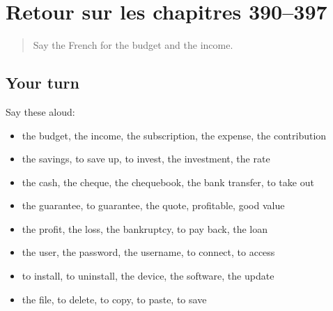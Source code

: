 \section[(dialogue)]{Retour sur les chapitres 390–397}

\label{lesson:FR-R397-revision-390-397}



\begin{quote}
Say the French for the budget and the income.
\end{quote}

\subsection*{Your turn}
Say these aloud:

\begin{itemize}
\raggedright
  \item the budget, the income, the subscription, the expense, the contribution
  \item the savings, to save up, to invest, the investment, the rate
  \item the cash, the cheque, the chequebook, the bank transfer, to take out
  \item the guarantee, to guarantee, the quote, profitable, good value
  \item the profit, the loss, the bankruptcy, to pay back, the loan
  \item the user, the password, the username, to connect, to access
  \item to install, to uninstall, the device, the software, the update
  \item the file, to delete, to copy, to paste, to save
\end{itemize}

